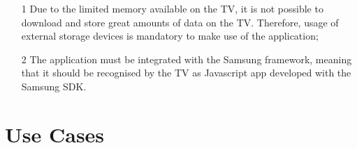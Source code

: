 \begin{itemize}
\item[1] Due to the limited memory available on the TV, it is not 
possible to download and store great amounts of data on the TV. 
Therefore, usage of external storage devices is mandatory to make use 
of the application;

\item[2] The application must be integrated with the Samsung 
framework, meaning that it should be recognised by the TV as 
Javascript app developed with the Samsung SDK.
\end{itemize}

\section{Use Cases}
\label{sec:use_cases}
